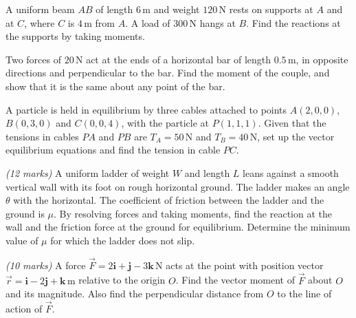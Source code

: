 \documentclass[11pt]{article}
\newcounter{popsec}
\newcounter{popsub}
\newcommand{\courssub}[1]{%
  \stepcounter{popsub}%
  \par\vspace{9pt}\noindent{\popxbold\fontsize{11.5}{13}\selectfont\color{popink}{\color{poporange}\thepopsec.\thepopsub}\hspace{6pt}#1}\par\nopagebreak\vspace{4pt}
}
\begin{document}
\begin{exercice}
A uniform beam $AB$ of length $6\,\mathrm{m}$ and weight $120\,\mathrm{N}$ rests on supports at $A$ and at $C$, where $C$ is $4\,\mathrm{m}$ from $A$. A load of $300\,\mathrm{N}$ hangs at $B$. Find the reactions at the supports by taking moments.
\end{exercice}

\begin{exercice}
Two forces of $20\,\mathrm{N}$ act at the ends of a horizontal bar of length $0.5\,\mathrm{m}$, in opposite directions and perpendicular to the bar. Find the moment of the couple, and show that it is the same about any point of the bar.
\end{exercice}

\begin{exercice}
A particle is held in equilibrium by three cables attached to points $A(2,0,0)$, $B(0,3,0)$ and $C(0,0,4)$, with the particle at $P(1,1,1)$. Given that the tensions in cables $PA$ and $PB$ are $T_A = 50\,\mathrm{N}$ and $T_B = 40\,\mathrm{N}$, set up the vector equilibrium equations and find the tension in cable $PC$.
\end{exercice}

\courssub{I prepare for the GCE}

\begin{exercice} \textit{(12 marks)}
A uniform ladder of weight $W$ and length $L$ leans against a smooth vertical wall with its foot on rough horizontal ground. The ladder makes an angle $\theta$ with the horizontal. The coefficient of friction between the ladder and the ground is $\mu$. By resolving forces and taking moments, find the reaction at the wall and the friction force at the ground for equilibrium. Determine the minimum value of $\mu$ for which the ladder does not slip.
\end{exercice}

\begin{exercice} \textit{(10 marks)}
A force $\vec{F} = 2\mathbf{i} + \mathbf{j} - 3\mathbf{k}\,\mathrm{N}$ acts at the point with position vector $\vec{r} = \mathbf{i} - 2\mathbf{j} + \mathbf{k}\,\mathrm{m}$ relative to the origin $O$. Find the vector moment of $\vec{F}$ about $O$ and its magnitude. Also find the perpendicular distance from $O$ to the line of action of $\vec{F}$.
\end{exercice}
\end{document}

